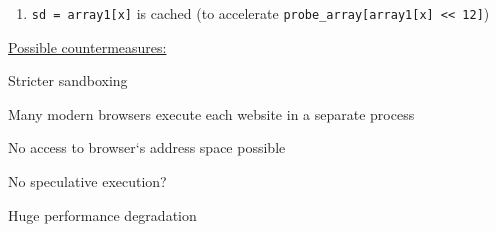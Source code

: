 \documentclass[landscape, a4paper]{article}
\begin{document}
\begin{minipage}[t]{0.198\pagewidth}
\begin{betterlist}
\begin{enumerate}
			\item \verb|sd = array1[x]| is cached (to accelerate \verb|probe_array[array1[x] << 12]|)
		\end{enumerate}
		\item \underline{Possible countermeasures:}
		\begin{betterlist}
			\item Stricter sandboxing
			\begin{betterlist}
				\item Many modern browsers execute each website in a separate process
				\item No access to browser‘s address space possible
			\end{betterlist}
			\item No speculative execution?
			\begin{betterlist}
				\item Huge performance degradation
			\end{betterlist}
		\end{betterlist}
	\end{betterlist}
\end{minipage}
\end{document}
